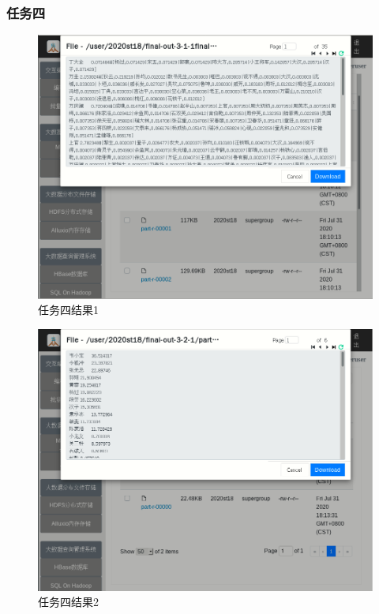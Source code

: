 \documentclass[a4paper,UTF8]{article}
\numberwithin{equation}{section}
\begin{document}
\subsubsection{任务四}
\begin{figure}[H]
    \centering
    \includegraphics[width = 15cm]{task4-1-output.png}
    \caption{任务四结果1}
\end{figure}
\begin{figure}[H]
    \centering
    \includegraphics[width = 15cm]{task4-2-output.png}
    \caption{任务四结果2}
\end{figure}
\end{document}
